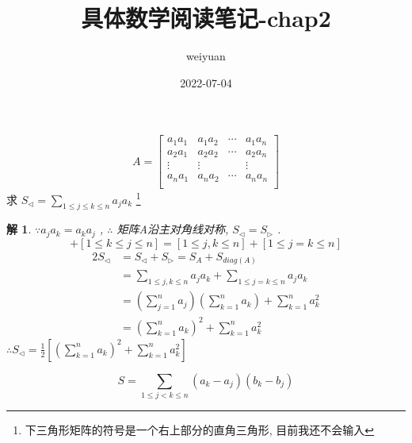 \documentclass[mode=geye]{elegantnote}
\title{具体数学阅读笔记-chap2}
\author{weiyuan}
\date{2022-07-04}
\newtheorem{solve}{解}
\begin{document}
\maketitle
\begin{equation}
    A = \begin{bmatrix}
        a_1 a_1 & a_1 a_2 & \cdots & a_1 a_n \\
        a_2 a_1 & a_2 a_2 & \cdots & a_2 a_n \\
        \vdots  & \vdots  &        & \vdots  \\
        a_n a_1 & a_n a_2 & \cdots & a_n a_n \\
    \end{bmatrix}
\end{equation}
求 $ S_{\triangleleft} = \sum_{1\leqslant j \leqslant k \leqslant n} a_j a_k $ \footnote{下三角形矩阵的符号是一个右上部分的直角三角形, 目前我还不会输入}

\begin{solve}
    $ \because a_j a_k = a_k a_j $ , $ \therefore  $ 矩阵A沿主对角线对称, $ S_{\triangleleft} = S_{\triangleright} $ .
    \begin{equation*}
        [1\leqslant j \leqslant k \leqslant n] + [1\leqslant k \leqslant j \leqslant n] =[1\leqslant j , k \leqslant n] + [1\leqslant j = k \leqslant n]
    \end{equation*}
    \begin{align*}
        2S_{\triangleleft} &= S_{\triangleleft}+S_{\triangleright} = S_{A}+S_{diag(A)} \\
        &= \sum_{1\leqslant j , k \leqslant n} a_j a_k + \sum_{1\leqslant j = k \leqslant n} a_j a_k\\
        &= \left(\sum_{j=1}^{n} a_j\right)\left(\sum_{k=1}^{n} a_k\right) + \sum_{k=1}^{n} a_k^2\\
        &= \left(\sum_{k=1}^{n} a_k\right)^2 + \sum_{k=1}^{n} a_k^2
    \end{align*}
    $ \therefore S_{\triangleleft} = \frac{1}{2}[\left(\sum_{k=1}^{n} a_k\right)^2 + \sum_{k=1}^{n} a_k^2] $ 
\end{solve}

\begin{equation}
    S = \sum_{1\leqslant j < k \leqslant n} (a_k-a_j)(b_k-b_j)
\end{equation}
\end{document}
